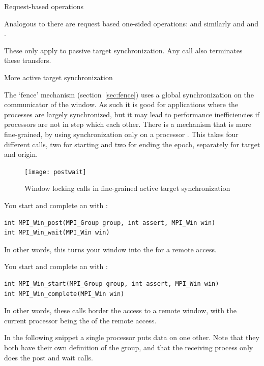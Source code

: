  {Request-based operations}

Analogous to  there are request based one-sided operations:
%
%
and similarly  and
and .

These only apply to passive target synchronization.
Any  call also terminates these transfers.

 {More active target synchronization}
\label{sec:ref:post-wait}

The `fence' mechanism (section~\ref{sec:fence}) uses a global synchronization on the
communicator of the window. As such it is good for applications where
the processes are largely synchronized, but it may 
lead to performance inefficiencies if processors are not in step which each other. 
There is a mechanism that is more fine-grained, by using synchronization only 
on a processor . This takes four different calls, two for starting
and two for ending the epoch, separately for target and origin.
\begin{figure}[ht]
  \texttt{[image: postwait]}
  \caption{Window locking calls in fine-grained active target synchronization}
  \label{fig:postwait}
\end{figure}

You start and complete an  with%
:
\begin{lstlisting}
int MPI_Win_post(MPI_Group group, int assert, MPI_Win win)
int MPI_Win_wait(MPI_Win win)
\end{lstlisting}
In other words, this turns your window into the  for a remote access.

You start and complete an  with%
:
\begin{lstlisting}
int MPI_Win_start(MPI_Group group, int assert, MPI_Win win)
int MPI_Win_complete(MPI_Win win)
\end{lstlisting}
In other words, these calls border the access to a remote window, with the current processor
being the  of the remote access.

In the following snippet a single processor puts data on one
other. Note that they both have their own definition of the group, and
that the receiving process only does the post and wait calls.
%

